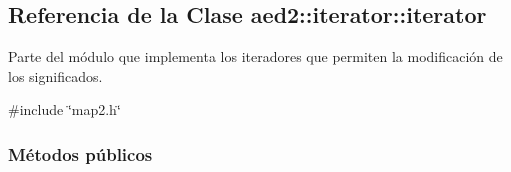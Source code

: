\hypertarget{classaed2_1_1iterator_1_1iterator}{\subsection{\-Referencia de la \-Clase aed2\-:\-:iterator\-:\-:iterator}
\label{classaed2_1_1iterator_1_1iterator}
}


\-Parte del módulo que implementa los iteradores que permiten la modificación de los significados.  




{\ttfamily \#include \char`\"{}map2.\-h\char`\"{}}

\subsubsection*{\-Métodos públicos}

